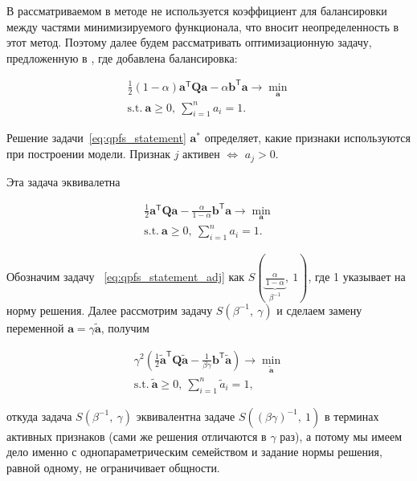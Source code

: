 \documentclass[12pt, twoside]{article}
\newcommand{\ba}{\mathbf{a}}
\newcommand{\bb}{\mathbf{b}}
\newcommand{\bQ}{\mathbf{Q}}
\newcommand{\getT}{^{\mathsf{T}}}
\begin{document}
В рассматриваемом в \cite{Katrutsa15} методе не используется коэффициент для балансировки между частями минимизируемого функционала, что вносит неопределенность в этот метод. Поэтому далее будем рассматривать оптимизационную задачу, предложенную в \cite{qpfs_original}, где добавлена балансировка:

\begin{equation}
\begin{gathered}
\frac{1}{2}(1 - \alpha) \ba\getT \bQ \ba  - \alpha \bb\getT \ba \to \min_{\ba} \\ 
\text{s.t.}\: \ba \geq 0,\:\sum\limits_{i=1}^n a_i = 1.
\label{eq:qpfs_statement}
\end{gathered}
\end{equation}

Решение задачи~\eqref{eq:qpfs_statement} $\ba^*$ определяет, какие признаки используются при построении модели. Признак $j$ активен $\Longleftrightarrow$ $a_j > 0$.

Эта задача эквивалетна

\begin{equation}
\begin{gathered}
\label{eq:qpfs_statement_adj}
\frac{1}{2} \ba\getT \bQ \ba - \frac{\alpha}{1-\alpha} \bb\getT \ba \to \min_{\ba}\\
\text{s.t.}\: \ba \geq 0,\:\sum\limits_{i=1}^n a_i = 1.
\end{gathered}
\end{equation}

Обозначим задачу ~\eqref{eq:qpfs_statement_adj} как $S\left(\underbrace{\frac{\alpha}{1 - \alpha}}_{\beta^{-1}},\:1\right)$, где 1 указывает на норму решения. Далее рассмотрим задачу $S(\beta^{-1},\:\gamma)$ и сделаем замену переменной $\ba = \gamma \tilde{\ba}$, получим

\begin{equation}
\begin{gathered}
\gamma^2 \left(\frac{1}{2} \tilde{\ba}\getT \bQ \tilde{\ba} - \frac{1}{\beta\gamma} \bb\getT \tilde{\ba}\right) \to \min_{\tilde{\ba}}\\
\text{s.t.}\: \tilde{\ba} \geq 0,\:\sum\limits_{i=1}^n \tilde{a}_i = 1,
\end{gathered}
\end{equation}

откуда задача $S(\beta^{-1},\:\gamma)$ эквивалентна задаче $S((\beta \gamma)^{-1},\:1)$ в терминах активных признаков (сами же решения отличаются в $\gamma$ раз), а потому мы имеем дело именно с однопараметрическим семейством и задание нормы решения, равной одному, не ограничивает общности.
\end{document}
